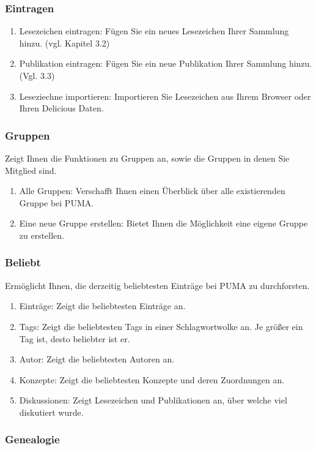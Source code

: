 \documentclass[a4paper,11pt,twoside]{scrbook}
\begin{document}
\subsubsection{Eintragen}
\begin{enumerate}
    \item Lesezeichen eintragen: Fügen Sie ein neues Lesezeichen Ihrer Sammlung hinzu. (vgl. Kapitel 3.2) 
    \item Publikation eintragen: Fügen Sie ein neue Publikation Ihrer Sammlung hinzu. (Vgl. 3.3)
    \item Leseziechne importieren: Importieren Sie Lesezeichen aus Ihrem Browser oder Ihren Delicious Daten.
\end{enumerate}
\subsubsection{Gruppen}
Zeigt Ihnen die Funktionen zu Gruppen an, sowie die Gruppen in denen Sie Mitglied sind.
\begin{enumerate}
    \item Alle Gruppen: Verschafft Ihnen einen Überblick über alle existierenden Gruppe bei PUMA.
    \item Eine neue Gruppe erstellen: Bietet Ihnen die Möglichkeit eine eigene Gruppe zu erstellen.
\end{enumerate}
\subsubsection{Beliebt}
Ermöglicht Ihnen, die derzeitig beliebtesten Einträge bei PUMA zu durchforsten.
\begin{enumerate}
    \item Einträge: Zeigt die beliebtesten Einträge an.
    \item Tags: Zeigt die beliebtesten Tags in einer Schlagwortwolke an. Je größer ein Tag ist, desto beliebter ist er.
    \item Autor: Zeigt die beliebtesten Autoren an.
    \item Konzepte: Zeigt die beliebtesten Konzepte und deren Zuordnungen an. 
    \item Diskussionen: Zeigt Lesezeichen und Publikationen an, über welche viel diskutiert wurde. 
\end{enumerate}
\subsubsection{Genealogie}
\end{document}
